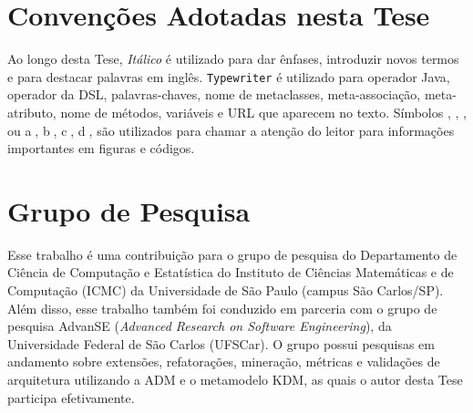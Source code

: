     
\section{Convenções Adotadas nesta Tese}\label{sec:convencoes}

Ao longo desta Tese, \textit{Itálico} é utilizado para dar ênfases, introduzir novos termos e para destacar palavras em inglês. \texttt{Typewriter} é utilizado para operador Java, operador da DSL, palavras-chaves, nome de metaclasses, meta-associação, meta-atributo, nome de métodos, variáveis e URL que aparecem no texto. Símbolos , , ,  ou \textcircled{a}, \textcircled{b}, \textcircled{c}, \textcircled{d}, são utilizados para chamar a atenção do leitor para informações importantes em figuras e códigos.

\section{Grupo de Pesquisa}

Esse trabalho é uma contribuição para o grupo de pesquisa do Departamento de Ciência de Computação e Estatística do Instituto de Ciências Matemáticas e de Computação (ICMC) da Universidade de São Paulo (campus São Carlos/SP). Além disso, esse trabalho também foi conduzido em parceria com o grupo de pesquisa AdvanSE (\textit{Advanced Research on Software Engineering}), da Universidade Federal de São Carlos (UFSCar). O grupo possui pesquisas em andamento sobre extensões, refatorações, mineração, métricas e validações de arquitetura utilizando a ADM e o metamodelo KDM, as quais o autor desta Tese participa efetivamente.

